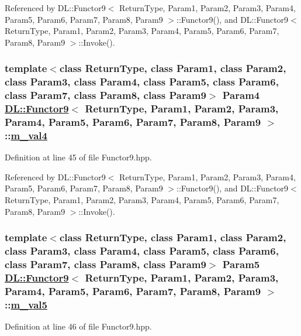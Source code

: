 Referenced by DL::Functor9$<$ Return\-Type, Param1, Param2, Param3, Param4, Param5, Param6, Param7, Param8, Param9 $>$::Functor9(), and DL::Functor9$<$ Return\-Type, Param1, Param2, Param3, Param4, Param5, Param6, Param7, Param8, Param9 $>$::Invoke().\hypertarget{classDL_1_1Functor9_r4}{
\subsubsection[m\_\-val4]{\setlength{\rightskip}{0pt plus 5cm}template$<$class Return\-Type, class Param1, class Param2, class Param3, class Param4, class Param5, class Param6, class Param7, class Param8, class Param9$>$ Param4 \hyperlink{classDL_1_1Functor9}{DL::Functor9}$<$ Return\-Type, Param1, Param2, Param3, Param4, Param5, Param6, Param7, Param8, Param9 $>$::\hyperlink{classDL_1_1Functor9_r4}{m\_\-val4}}}
\label{classDL_1_1Functor9_r4}




Definition at line 45 of file Functor9.hpp.

Referenced by DL::Functor9$<$ Return\-Type, Param1, Param2, Param3, Param4, Param5, Param6, Param7, Param8, Param9 $>$::Functor9(), and DL::Functor9$<$ Return\-Type, Param1, Param2, Param3, Param4, Param5, Param6, Param7, Param8, Param9 $>$::Invoke().\hypertarget{classDL_1_1Functor9_r5}{
\subsubsection[m\_\-val5]{\setlength{\rightskip}{0pt plus 5cm}template$<$class Return\-Type, class Param1, class Param2, class Param3, class Param4, class Param5, class Param6, class Param7, class Param8, class Param9$>$ Param5 \hyperlink{classDL_1_1Functor9}{DL::Functor9}$<$ Return\-Type, Param1, Param2, Param3, Param4, Param5, Param6, Param7, Param8, Param9 $>$::\hyperlink{classDL_1_1Functor9_r5}{m\_\-val5}}}
\label{classDL_1_1Functor9_r5}




Definition at line 46 of file Functor9.hpp.

